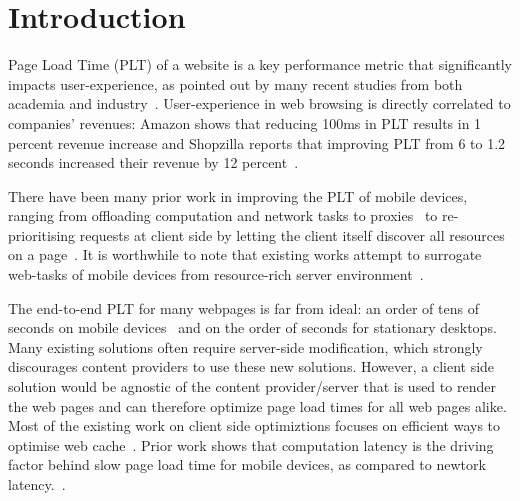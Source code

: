 \section{Introduction}
\label{sec:intro}

Page Load Time (PLT) of a website is a key performance metric that
significantly impacts user-experience, as pointed out by many recent studies
from both academia and industry~\cite{bhatti2000integrating, bouch2000quality}.
User-experience in web browsing is directly correlated to companies' revenues:
Amazon shows that reducing 100ms in PLT results in 1 percent revenue increase
and Shopzilla reports that improving PLT from 6 to 1.2 seconds increased their
revenue by 12 percent~\cite{url3}. 

There have been many prior work in improving the PLT of mobile devices,
ranging from offloading computation and network tasks to
proxies~\cite{netravali2015mahimahi, sivakumar2014parcel, wang2014speedy} to
re-prioritising requests at client side by letting the client itself discover
all resources on a page~\cite{butkiewicz2015klotski, netravali2016polaris}.  It
is worthwhile to note that existing works attempt to surrogate web-tasks of
mobile devices from resource-rich server
environment~\cite{ruamviboonsuk2017vroom}.
 
The end-to-end PLT for many webpages is far from ideal: an order
of tens of seconds on mobile devices~\cite{wang2013demystifying} and
on the order of seconds for stationary desktops.  Many existing solutions
often require server-side modification, which strongly discourages
content providers to use these new solutions. 
However, a client side solution would be agnostic of the content
provider/server that is used to render the web pages and
can therefore optimize page load times for all web pages alike. 
Most of the existing work on client side optimiztions focuses on efficient ways to
optimise web cache~\cite{wang2014much}.  
Prior work shows that computation latency is the driving factor behind slow page load time for mobile devices, as compared to newtork latency.~\cite{vesuna2016caching}.

